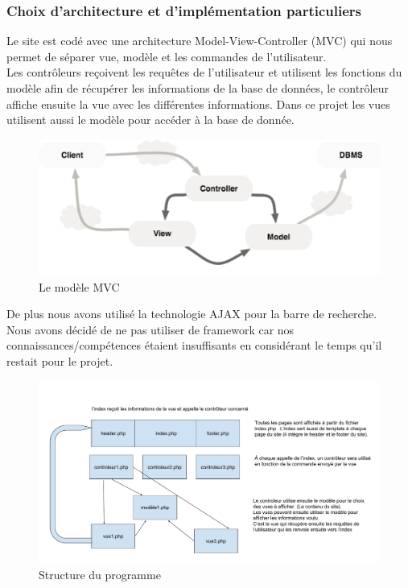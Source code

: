 \documentclass[a4paper,12pt,abstracton,titlepage]{scrartcl}
\begin{document}
\subsubsection{Choix d'architecture et d'implémentation particuliers}
Le site est codé avec une architecture Model-View-Controller (MVC) qui nous permet de séparer vue, modèle et les commandes de l'utilisateur.\\
Les contrôleurs reçoivent les requêtes de l'utilisateur et utilisent les fonctions du modèle afin de récupérer les informations de la base de données, le contrôleur affiche ensuite la vue avec les différentes informations. Dans ce projet les vues utilisent aussi le modèle pour accéder à la base de donnée.\\
\begin{figure}[h]
  \centering
    \includegraphics[width=\textwidth]{./doc/mvc.png}
	\caption{Le modèle MVC}
	\label{mvc}
\end{figure}

De plus nous avons utilisé la technologie AJAX pour la barre de recherche.\\
Nous avons décidé de ne pas utiliser de framework car nos connaissances/compétences étaient insuffisants en considérant le temps qu'il restait pour le projet.\\

\begin{figure}[h]
  \centering
    \includegraphics[width=\textwidth, trim=5mm 5mm 140mm 35mm, clip]{./doc/structure.pdf}
	\caption{Structure du programme}
	\label{pdacc}
\end{figure}
\vspace{1cm}
\end{document}
